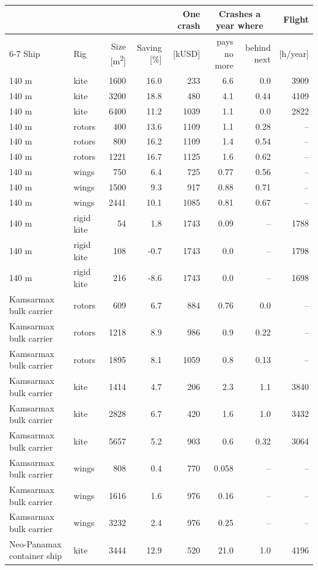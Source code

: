 \begin{tabular}{@{}llrrrrrr@{}}
\toprule
 & & & & One crash & \multicolumn{2}{c}{Crashes a year where} & Flight \\
\cmidrule(lr){6-7}
Ship & Rig & Size [m\textsuperscript{2}] & Saving [\%] & [kUSD] & pays no more & behind next & [h/year] \\
\midrule
140 m & kite & 1600 & 16.0 & 233 & 6.6 & 0.0 & 3909 \\
140 m & kite & 3200 & 18.8 & 480 & 4.1 & 0.44 & 4109 \\
140 m & kite & 6400 & 11.2 & 1039 & 1.1 & 0.0 & 2822 \\
140 m & rotors & 400 & 13.6 & 1109 & 1.1 & 0.28 & -- \\
140 m & rotors & 800 & 16.2 & 1109 & 1.4 & 0.54 & -- \\
140 m & rotors & 1221 & 16.7 & 1125 & 1.6 & 0.62 & -- \\
140 m & wings & 750 & 6.4 & 725 & 0.77 & 0.56 & -- \\
140 m & wings & 1500 & 9.3 & 917 & 0.88 & 0.71 & -- \\
140 m & wings & 2441 & 10.1 & 1085 & 0.81 & 0.67 & -- \\
140 m & rigid kite & 54 & 1.8 & 1743 & 0.09 & -- & 1788 \\
140 m & rigid kite & 108 & -0.7 & 1743 & 0.0 & -- & 1798 \\
140 m & rigid kite & 216 & -8.6 & 1743 & 0.0 & -- & 1698 \\
Kamsarmax bulk carrier & rotors & 609 & 6.7 & 884 & 0.76 & 0.0 & -- \\
Kamsarmax bulk carrier & rotors & 1218 & 8.9 & 986 & 0.9 & 0.22 & -- \\
Kamsarmax bulk carrier & rotors & 1895 & 8.1 & 1059 & 0.8 & 0.13 & -- \\
Kamsarmax bulk carrier & kite & 1414 & 4.7 & 206 & 2.3 & 1.1 & 3840 \\
Kamsarmax bulk carrier & kite & 2828 & 6.7 & 420 & 1.6 & 1.0 & 3432 \\
Kamsarmax bulk carrier & kite & 5657 & 5.2 & 903 & 0.6 & 0.32 & 3064 \\
Kamsarmax bulk carrier & wings & 808 & 0.4 & 770 & 0.058 & -- & -- \\
Kamsarmax bulk carrier & wings & 1616 & 1.6 & 976 & 0.16 & -- & -- \\
Kamsarmax bulk carrier & wings & 3232 & 2.4 & 976 & 0.25 & -- & -- \\
Neo-Panamax container ship & kite & 3444 & 12.9 & 520 & 21.0 & 1.0 & 4196 \\

\end{tabular}
